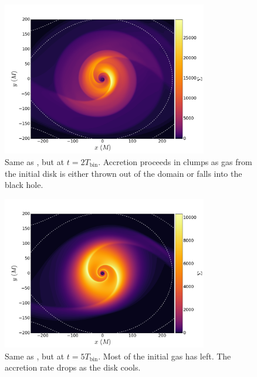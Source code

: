 \begin{figure}
\begin{center}
\includegraphics[width=0.8\textwidth]{figures/minidisk/q011_m3_sig_0200.pdf}
\end{center}
\caption{ Same as , but at $t = 2 T_\text{bin}$.  Accretion proceeds in clumps as gas from the initial disk is either thrown out of the domain or falls into the black hole.}
\end{figure}

\begin{figure}
\begin{center}
\includegraphics[width=0.8\textwidth]{figures/minidisk/q011_m3_sig_0500.pdf}
\end{center}
\caption{ Same as , but at $t = 5 T_\text{bin}$.  Most of the initial gas has left. The accretion rate drops as the disk cools.}
\end{figure}

